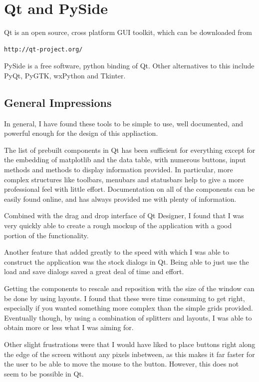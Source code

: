 \documentclass[whitecover]{MO_report}
\begin{document}
\pagebreak


\chapter{Qt and PySide}

Qt is an open source, cross platform GUI toolkit, which can be downloaded from

\begin{verbatim}
http://qt-project.org/
\end{verbatim}

PySide is a free software, python binding of Qt. Other alternatives to this
include PyQt, PyGTK, wxPython and Tkinter.

\section{General Impressions}

In general, I have found these tools to be simple to use, well documented, and
powerful enough for the design of this appliaction.

The list of prebuilt components in Qt has been sufficient for everything except
for the embedding of matplotlib and the data table, with numerous buttons,
input methods and methods to display information provided. In particular, more
complex structures like toolbars, menubars and statusbars help to give a more
professional feel with little effort. Documentation on all of the components
can be easily found online, and has always provided me with plenty of
information.

Combined with the drag and drop interface of Qt Designer, I found that I was very
quickly able to create a rough mockup of the application with a good portion
of the functionality.

Another feature that added greatly to the speed with which I was able to
construct the application was the stock dialogs in Qt. Being able to just use
the load and save dialogs saved a great deal of time and effort. 

Getting the components to rescale and reposition with the size of the window
can be done by using layouts. I found that these were time consuming to get
right, especially if you wanted something more complex than the simple grids
provided. Eventually though, by using a combination of splitters and layouts,
I was able to obtain more or less what I was aiming for.

Other slight frustrations were that I would have liked to place buttons right
along the edge of the screen without any pixels inbetween, as this makes it far
faster for the user to be able to move the mouse to the button. However, this
does not seem to be possible in Qt. 
\end{document}
